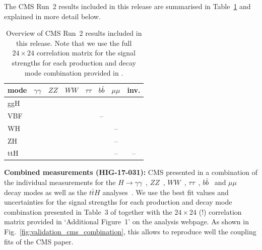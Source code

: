 The CMS Run~2 results included in this release are summarised in Table~\ref{tab:CMSresults} and explained in more detail below.

\begin{table}[h]\centering
\begin{tabular}{l | ccccccc}
mode & $\gamma\gamma$ & $ZZ$ & $WW$ & $\tau\tau$ & $b\bar b$ & $\mu\mu$ & inv. \\
\hline
ggH & \cite{Sirunyan:2018koj} & \cite{Sirunyan:2018koj} & \cite{Sirunyan:2018koj} & \cite{Sirunyan:2018koj} & \cite{Sirunyan:2018koj} & \cite{Sirunyan:2018koj} & \cite{Sirunyan:2018owy} \\
VBF &  \cite{Sirunyan:2018koj} & \cite{Sirunyan:2018koj} & \cite{Sirunyan:2018koj} & \cite{Sirunyan:2018koj} &-- & \cite{Sirunyan:2018koj} & \cite{Sirunyan:2018owy} \\
WH &  \cite{Sirunyan:2018koj} & \cite{Sirunyan:2018koj} & \cite{Sirunyan:2018koj} & \cite{Sirunyan:2018cpi} & \cite{Sirunyan:2018koj} & -- & \cite{Sirunyan:2018owy} \\
ZH & \cite{Sirunyan:2018koj} & \cite{Sirunyan:2018koj} & \cite{Sirunyan:2018koj} & \cite{Sirunyan:2018cpi} & \cite{Sirunyan:2018koj} & -- & \cite{Sirunyan:2018owy} \\
ttH & \cite{Sirunyan:2018koj} & \cite{Sirunyan:2018koj} & \cite{Sirunyan:2018koj} & \cite{Sirunyan:2018koj} & \cite{Sirunyan:2018koj} & -- & -- \\
\end{tabular}
\caption{Overview of CMS Run~2 results included in this release. Note that we use the full $24\times 24$ correlation matrix 
for the signal strengths for each production and decay mode combination provided in \cite{Sirunyan:2018koj}.}
\label{tab:CMSresults}
\end{table}



{\bf\boldmath Combined measurements (HIG-17-031):} 
CMS presented in \cite{Sirunyan:2018koj} a combination of the individual measurements for the 
$H\to \gamma\gamma$~\cite{Sirunyan:2018ouh}, $ZZ$~\cite{Sirunyan:2017exp}, $WW$~\cite{Sirunyan:2018egh}, 
$\tau\tau$~\cite{Sirunyan:2017khh}, $b\bar b$~\cite{Sirunyan:2017elk,Sirunyan:2017dgc} and $\mu\mu$~\cite{Sirunyan:2018hbu} 
decay modes as well as the $t\bar tH$ analyses~\cite{Sirunyan:2018shy,Sirunyan:2018mvw,Sirunyan:2018ygk}. 
We use the best fit values and uncertainties for the signal strengths for each production %
and decay  %
mode combination presented in Table~3 of \cite{Sirunyan:2018koj} together with the $24\times 24$ (!) correlation matrix 
provided in `Additional Figure~1' on the analysis webpage. As shown in Fig.~\ref{fig:validation_cms_combination}, 
this allows to reproduce well the coupling fits of the CMS paper.\\

